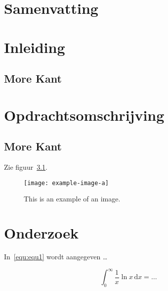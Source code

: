 \documentclass[a4paper,12pt]{book} %
\begin{document}
\chapter{Samenvatting}
\kant[1-2]

\mainmatter
\chapter{Inleiding}
\kant[1]
\section{More Kant}
\kant[1-6]

\chapter{Opdrachtsomschrijving}
\kant[7]
\section{More Kant}
\kant[8]

Zie figuur~\ref{fig:fig1}.

\begin{figure}[!ht]
\centering
\texttt{[image: example-image-a]}
\caption{This is an example of an image.}
\label{fig:fig1}
\end{figure}
\kant[9]

\chapter{Onderzoek}

\kant[1]
In~\eqref{equ:equ1} wordt aangegeven \ldots

\begin{equation}
\label{equ:equ1}
\int_{0}^{\infty} \frac{1}{x}\ln x\, \mathrm{d}x = \ldots
\end{equation}
\end{document}
